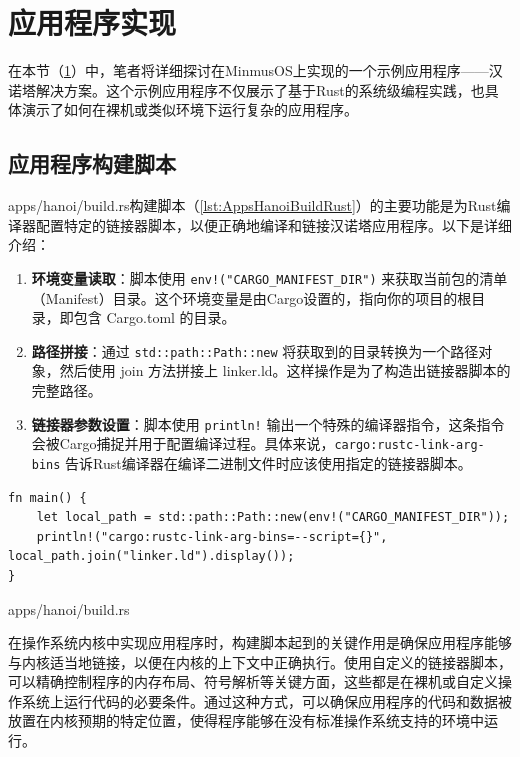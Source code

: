 \section{应用程序实现}\label{sec:ApplicationsImplementation}

在本节（\cref{sec:ApplicationsImplementation}）中，笔者将详细探讨在MinmusOS上实现的一个示例应用程序——汉诺塔解决方案。这个示例应用程序不仅展示了基于Rust的系统级编程实践，也具体演示了如何在裸机或类似环境下运行复杂的应用程序。

\subsection{应用程序构建脚本}

apps/hanoi/build.rs构建脚本（\cref{lst:AppsHanoiBuildRust}）的主要功能是为Rust编译器配置特定的链接器脚本，以便正确地编译和链接汉诺塔应用程序。以下是详细介绍：

\begin{enumerate}
    \item \textbf{环境变量读取}：脚本使用 \texttt{env!("CARGO\_MANIFEST\_DIR")} 来获取当前包的清单（Manifest）目录。这个环境变量是由Cargo设置的，指向你的项目的根目录，即包含 Cargo.toml 的目录。
    \item \textbf{路径拼接}：通过 \texttt{std::path::Path::new} 将获取到的目录转换为一个路径对象，然后使用 join 方法拼接上 linker.ld。这样操作是为了构造出链接器脚本的完整路径。
    \item \textbf{链接器参数设置}：脚本使用 \texttt{println!} 输出一个特殊的编译器指令，这条指令会被Cargo捕捉并用于配置编译过程。具体来说，\texttt{cargo:rustc-link-arg-bins} 告诉Rust编译器在编译二进制文件时应该使用指定的链接器脚本。
\end{enumerate}

\begin{listing}[htbp]
    \begin{verbatim}
fn main() {
    let local_path = std::path::Path::new(env!("CARGO_MANIFEST_DIR"));
    println!("cargo:rustc-link-arg-bins=--script={}", local_path.join("linker.ld").display());
}
    \end{verbatim}
    \caption{apps/hanoi/build.rs}\label{lst:AppsHanoiBuildRust}
\end{listing}

在操作系统内核中实现应用程序时，构建脚本起到的关键作用是确保应用程序能够与内核适当地链接，以便在内核的上下文中正确执行。使用自定义的链接器脚本，可以精确控制程序的内存布局、符号解析等关键方面，这些都是在裸机或自定义操作系统上运行代码的必要条件。通过这种方式，可以确保应用程序的代码和数据被放置在内核预期的特定位置，使得程序能够在没有标准操作系统支持的环境中运行。

